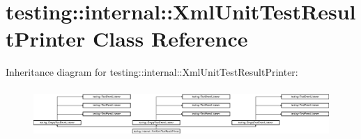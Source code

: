 \hypertarget{classtesting_1_1internal_1_1_xml_unit_test_result_printer}{}\section{testing\+::internal\+::Xml\+Unit\+Test\+Result\+Printer Class Reference}
\label{classtesting_1_1internal_1_1_xml_unit_test_result_printer}
Inheritance diagram for testing\+::internal\+::Xml\+Unit\+Test\+Result\+Printer\+:\begin{figure}[H]
\begin{center}
\leavevmode
\includegraphics[height=1.889339cm]{d3/dc6/classtesting_1_1internal_1_1_xml_unit_test_result_printer}
\end{center}
\end{figure}
